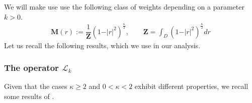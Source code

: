 \documentclass[a4paper,12pt, reqno]{amsart}
\begin{document}
We will make use use the following class of weights depending on a parameter $k>0$. 
  \begin{align}\label{weight}
   \mathbf{M}(r):=\dfrac{1}{\mathbf{Z}}(1-\vert r\vert^2)^{\frac{\kappa}{2}}, \qquad \mathbf{Z}= \int_D (1-\vert r\vert^2)^{\frac{\kappa}{2}} dr
\end{align}
Let us recall the following results, which we use in our analysis.
\subsubsection{The operator $\mathcal{L}_k$}\label{subsect-opert-deter} Given that the cases $\kappa\geq 2$ and $0<\kappa<2$ exhibit different properties, we recall some results of \cite[Subsection 3.3.]{Masmoudi2008}.\\
\end{document}
